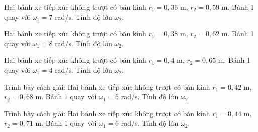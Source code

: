 \begin{ex}
Hai bánh xe tiếp xúc không trượt có bán kính $r_1=0,36$ m, $r_2=0,59$ m. Bánh 1 quay với $\omega_1=7$ rad/s. Tính độ lớn $\omega_2$.
\end{ex}

\begin{ex}
Hai bánh xe tiếp xúc không trượt có bán kính $r_1=0,38$ m, $r_2=0,62$ m. Bánh 1 quay với $\omega_1=8$ rad/s. Tính độ lớn $\omega_2$.
\end{ex}

\begin{ex}
Hai bánh xe tiếp xúc không trượt có bán kính $r_1=0,4$ m, $r_2=0,65$ m. Bánh 1 quay với $\omega_1=4$ rad/s. Tính độ lớn $\omega_2$.
\end{ex}

\begin{ex}
Trình bày cách giải: Hai bánh xe tiếp xúc không trượt có bán kính $r_1=0,42$ m, $r_2=0,68$ m. Bánh 1 quay với $\omega_1=5$ rad/s. Tính độ lớn $\omega_2$.
\choiceTF

\end{ex}

\begin{ex}
Trình bày cách giải: Hai bánh xe tiếp xúc không trượt có bán kính $r_1=0,44$ m, $r_2=0,71$ m. Bánh 1 quay với $\omega_1=6$ rad/s. Tính độ lớn $\omega_2$.
\choiceTF

\end{ex}

